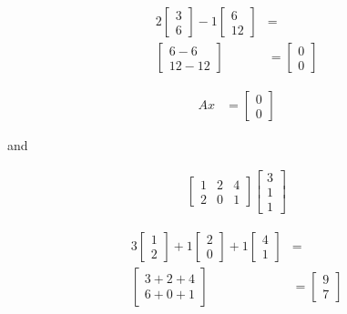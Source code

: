 \documentclass[paper=a4, fontsize=10pt]{scrartcl} %
\begin{document}
	\begin{align*}
		2 \begin{bmatrix}
			3 \\ 6
		\end{bmatrix}
		- 1 \begin{bmatrix}
			6 \\ 12
		\end{bmatrix}
		&= \\
		\begin{bmatrix}
			6 - 6 \\ 12 - 12
		\end{bmatrix}
		&=
		\begin{bmatrix}
			0 \\ 0
		\end{bmatrix}
	\end{align*}

	\begin{align}
		Ax &= \begin{bmatrix}
			0 \\ 0
		\end{bmatrix}
	\end{align}

	    and

	\begin{align*}
		\begin{bmatrix}
			1 & 2 & 4 \\
			2 & 0 & 1
		\end{bmatrix}
		\begin{bmatrix}
			3 \\
			1 \\
			1
		\end{bmatrix}
	\end{align*}

	\begin{align*}
		3 \begin{bmatrix}
			1 \\ 2
		\end{bmatrix}
		+ 1 \begin{bmatrix}
			2 \\ 0
		\end{bmatrix}
		+ 1 \begin{bmatrix}
			4 \\ 1
		\end{bmatrix}
		&= \\
		\begin{bmatrix}
			3 + 2 + 4 \\ 6 + 0 + 1
		\end{bmatrix}
		&=
		\begin{bmatrix}
			9 \\ 7
		\end{bmatrix}
	\end{align*}
\end{document}
